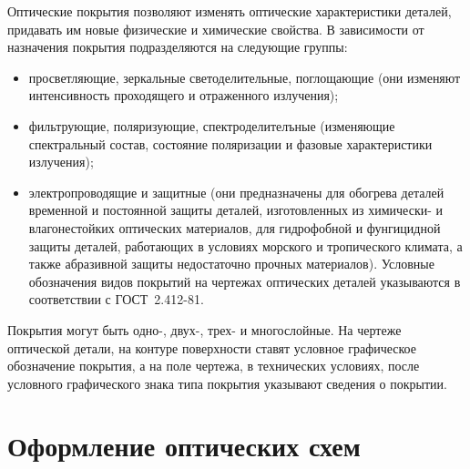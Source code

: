 \begin{enumerate}
	Оптические покрытия позволяют изменять оптические характеристики деталей, придавать им новые физические и химические свойства. В зависимости от назначения покрытия подразделяются на следующие группы:
	\begin{itemize}
		\item просветляющие, зеркальные светоделительные, поглощающие (они изменяют интенсивность проходящего и отраженного излучения);
		\item фильтрующие, поляризующие, спектроделителъные (изменяющие спектральный состав, состояние поляризации и фазовые характеристики излучения);
		\item электропроводящие и защитные (они предназначены для обогрева деталей временной и постоянной защиты деталей, изготовленных из химически- и влагонестойких оптических материалов, для гидрофобной и фунгицидной защиты деталей, работающих в условиях морского и тропического климата, а также абразивной защиты недостаточно прочных материалов). Условные обозначения видов покрытий на чертежах оптических деталей указываются в соответствии с ГОСТ~2.412-81. 
	\end{itemize}
	
	Покрытия могут быть одно-, двух-, трех- и многослойные. На чертеже оптической детали, на контуре поверхности ставят условное графическое обозначение покрытия, а на поле чертежа, в технических условиях, после условного графического знака типа покрытия указывают сведения о покрытии.

\end{enumerate}

\section{Оформление оптических схем}

